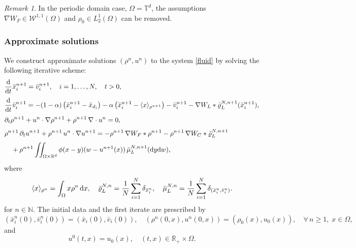 \documentclass[10pt, reqno]{amsart}
\theoremstyle{definition}
\theoremstyle{remark}
\newtheorem{remark}[theorem]{Remark}
\numberwithin{equation}{section}
\newcommand{\dx}{\textnormal{d}x}
\newcommand{\dy}{\textnormal{d}y}
\newcommand{\dw}{\textnormal{d}w}
\newcommand{\ddt}{\frac{\textnormal{d}}{\textnormal{d}t}}
\newcommand{\N}{\mathbb{N}}
\newcommand{\T}{\mathbb{T}}
\begin{document}
\begin{remark}In the periodic domain case, $\Omega = \T^d$, the assumptions $\nabla W_F \in \mathcal{W}^{1,1}(\Omega)$ and $\rho_0 \in L^1_2(\Omega)$ can be removed. 
\end{remark}

 

%
%
%
%
%

\subsubsection{Approximate solutions}

We construct approximate solutions $(\rho^n,u^n)$ to the system \eqref{fluid} by solving the following iterative scheme:
\begin{align}\label{fluid_app}
\begin{aligned}
    &\ddt \bar{x}_i^{n+1} = \bar{v}_i^{n+1}, \quad i = 1,\dots, N, \quad t > 0,\\[1mm]
    &\ddt \bar{v}_i^{n+1} = -(1-\alpha)\left(\bar{x}_i^{n+1} - \bar x_{d_i}\right) -\alpha \left(\bar{x}_i^{n+1} - \langle x \rangle_{\rho^{n+1}} \right) - \bar{v}_i^{n+1} - \nabla W_L *  \bar\varrho_{L}^{N, n+1}(\bar{x}_i^{n+1}),\\[1mm]
&\partial_t \rho^{n+1} + u^n \cdot \nabla \rho^{n+1} + \rho^{n+1}\, \nabla \cdot u^n = 0,\\[1mm]
&\rho^{n+1}\, \partial_t u^{n+1} + \rho^{n+1}\, u^n \cdot \nabla u^{n+1} = -\rho^{n+1}\, \nabla W_F * \rho^{n+1} - \rho^{n+1}\, \nabla W_C *  \bar\varrho_L^{N, n+1}\\[1mm]
&\quad + \rho^{n+1} \iint_{\Omega\times\mathbb{R}^d } \phi(x-y) ( w - u^{n+1}(x))\, \bar\mu_L^{N, n+1}(\dy\dw),
\end{aligned}
\end{align}
where 
\[
 \langle x \rangle_{\rho^{n}} = \int_{\Omega} x \rho^n \,\dx, \quad  \bar\varrho_L^{N, n} = \frac1N \sum_{i=1}^N \delta_{\bar{x}_i^{n}}, 
 \quad 
\bar\mu_L^{N, n} = \frac1N \sum_{i=1}^N \delta_{(\bar{x}_i^{n}, \bar{v}_i^{n})}.
\]
for $n \in \N$.
The initial data and the first iterate are prescribed by
\[
(\bar{x}_i^{n}(0), \bar{v}_i^{n}(0))= (\bar x_i(0), \bar v_i(0)), \quad (\rho^n(0,x), u^n(0,x)) = (\rho_0(x), u_0(x)), \quad \forall\, n \ge 1,\; x \in \Omega,
\]
and
\[
u^0(t,x) = u_0(x), \quad (t,x) \in \mathbb{R}_+ \times \Omega.
\]

 
\end{document}
